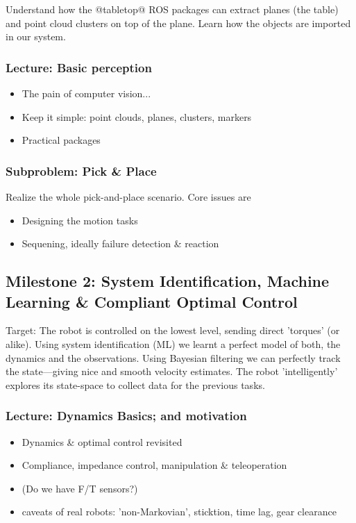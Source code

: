 \documentclass[10pt,fleqn,twoside]{article}
\begin{document}
Understand how the @tabletop@ ROS packages can extract planes (the
table) and point cloud clusters on top of the plane. Learn how the
objects are imported in our system.

\subsubsection{Lecture: Basic perception}
\begin{itemize}
\item The pain of computer vision...
\item Keep it simple: point clouds, planes, clusters, markers
\item Practical packages
\end{itemize}

\subsubsection{Subproblem: Pick \& Place}

Realize the whole pick-and-place scenario. Core issues are
\begin{itemize}
\item Designing the motion tasks
\item Sequening, ideally failure detection \& reaction
\end{itemize}




\subsection{Milestone 2: System Identification, Machine Learning \&
  Compliant Optimal Control}

Target: The robot is controlled on the lowest level, sending direct
'torques' (or alike). Using system identification (ML) we learnt a
perfect model of both, the dynamics and the observations. Using
Bayesian filtering we can perfectly track the state---giving nice and
smooth velocity estimates. The robot 'intelligently' explores its
state-space to collect data for the previous tasks.

\subsubsection{Lecture: Dynamics Basics; and motivation}

\begin{itemize}
\item Dynamics \& optimal control revisited
\item Compliance, impedance control, manipulation \& teleoperation
\item (Do we have F/T sensors?)
\item caveats of real robots: 'non-Markovian', sticktion, time lag,
  gear clearance
\end{itemize}
\end{document}
